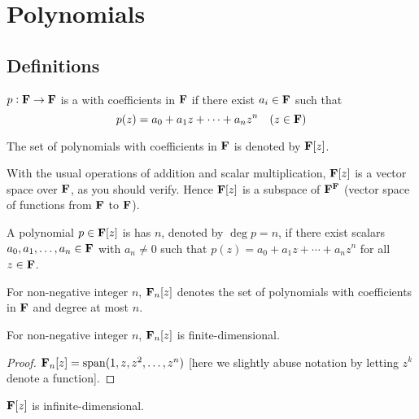 \chapter{Polynomials}
\section{Definitions}
\begin{definition}[Polynomial]
$p:\mathbf F\to\mathbf F$ is a  with coefficients in $\mathbf F$ if there exist $a_i\in\mathbf F$ such that
\[p(z)=a_0+a_1z+\cdots+a_nz^n\quad(z\in\mathbf F)\]
\end{definition}

\begin{notation}
The set of polynomials with coefficients in $\mathbf F$ is denoted by $\mathbf F[z]$.
\end{notation}

\begin{proposition}
With the usual operations of addition and scalar multiplication, $\mathbf F[z]$ is a vector space over $\mathbf F$, as you should verify. Hence $\mathbf F[z]$ is a subspace of $\mathbf F^\mathbf F$ (vector space of functions from $\mathbf F$ to $\mathbf F$).
\end{proposition}

\begin{definition}[Degree]
A polynomial $p\in\mathbf F[z]$ is has  $n$, denoted by $\deg p=n$, if there exist scalars $a_0,a_1,\dots,a_n\in\mathbf F$ with $a_n\neq0$ such that $p(z)=a_0+a_1z+\cdots+a_nz^n$ for all $z\in\mathbf F$.
\end{definition}

\begin{notation}
For non-negative integer $n$, $\mathbf F_n[z]$ denotes the set of polynomials with coefficients in $\mathbf F$ and degree at most $n$.
\end{notation}

\begin{proposition}
For non-negative integer $n$, $\mathbf F_n[z]$ is finite-dimensional.
\end{proposition}

\begin{proof}
$\mathbf F_n[z]=\operatorname{span}(1,z,z^2,\dots,z^n)$ [here we slightly abuse notation by letting $z^k$ denote a function]. 
\end{proof}

\begin{proposition}
$\mathbf F[z]$ is infinite-dimensional.
\end{proposition}

